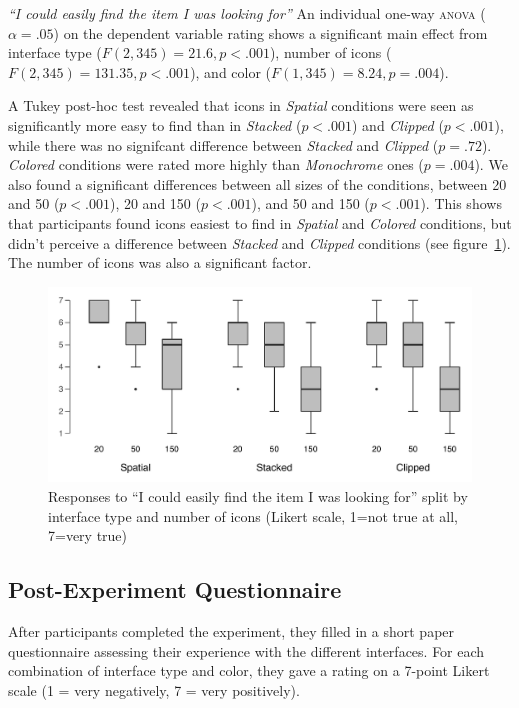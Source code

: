 \documentclass[nobib]{tufte-book} %
\begin{document}
\emph{``I could easily find the item I was looking for''}
An individual one-way \textsc{anova} ($\alpha = .05$) on the dependent variable rating shows a significant main effect from interface type ($F(2,345) = 21.6, p < .001$), number of icons ($F(2,345) = 131.35, p < .001$), and color ($F(1,345) = 8.24, p = .004$).

A Tukey post-hoc test revealed that icons in \emph{Spatial} conditions were seen as significantly more easy to find than in \emph{Stacked} ($p < .001$) and \emph{Clipped} ($p < .001$), while there was no signifcant difference between \emph{Stacked} and \emph{Clipped} ($p = .72$). \emph{Colored} conditions were rated more highly than \emph{Monochrome} ones ($p = .004$). We also found a significant differences between all sizes of the conditions, between 20 and 50 ($p < .001$), 20 and 150 ($p < .001$), and 50 and 150 ($p < .001$). This shows that participants found icons easiest to find in \emph{Spatial} and \emph{Colored} conditions, but didn't perceive a difference between \emph{Stacked} and \emph{Clipped} conditions (see figure~\ref{fig:easyfind}). The number of icons was also a significant factor.

\begin{figure}
\includegraphics{postcon-easy.pdf}
\caption{Responses to ``I could easily find the item I was looking for'' split by interface type and number of icons (Likert scale, 1=not true at all, 7=very true)}
\label{fig:easyfind}
\end{figure}


\subsection{Post-Experiment Questionnaire}
After participants completed the experiment, they filled in a short paper questionnaire assessing their experience with the different interfaces. For each combination of interface type and color, they gave a rating on a 7-point Likert scale (1 = very negatively, 7 = very positively).
\end{document}
